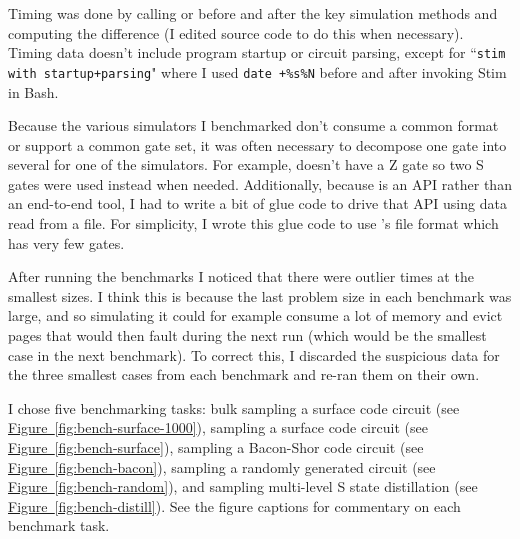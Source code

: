 \documentclass[onecolumn,unpublished]{quantumarticle}
\theoremstyle{definition}
\theoremstyle{definition}
\theoremstyle{definition}
\newcommand{\fig}[1]{\hyperref[fig:#1]{Figure~\ref*{fig:#1}}}
\begin{document}
Timing was done by calling  or  before and after the key simulation methods and computing the difference (I edited source code to do this when necessary).
Timing data doesn't include program startup or circuit parsing, except for ``\texttt{stim with startup+parsing}" where I used \texttt{date +\%s\%N} before and after invoking Stim in Bash.

Because the various simulators I benchmarked don't consume a common format or support a common gate set, it was often necessary to decompose one gate into several for one of the simulators.
For example,  doesn't have a Z gate so two S gates were used instead when needed.
Additionally, because  is an API rather than an end-to-end tool, I had to write a bit of glue code to drive that API using data read from a file.
For simplicity, I wrote this glue code to use 's file format which has very few gates.

After running the benchmarks I noticed that there were outlier times at the smallest sizes.
I think this is because the last problem size in each benchmark was large, and so simulating it could for example consume a lot of memory and evict pages that would then fault during the next run (which would be the smallest case in the next benchmark).
To correct this, I discarded the suspicious data for the three smallest cases from each benchmark and re-ran them on their own.

I chose five benchmarking tasks: bulk sampling a surface code circuit (see \fig{bench-surface-1000}), sampling a surface code circuit (see \fig{bench-surface}), sampling a Bacon-Shor code circuit (see \fig{bench-bacon}), sampling a randomly generated circuit (see \fig{bench-random}), and sampling multi-level S state distillation (see \fig{bench-distill}).
See the figure captions for commentary on each benchmark task.
\end{document}
